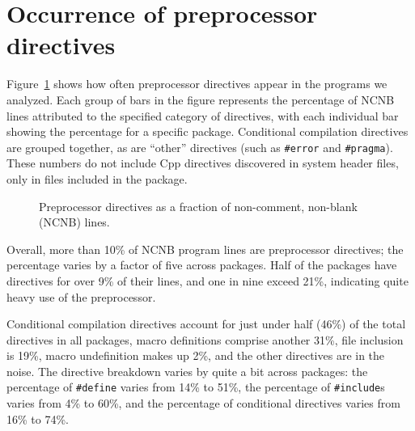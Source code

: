 \documentclass[11pt]{article}
\begin{document}
\section{Occurrence of preprocessor directives}
\label{sec:directives}

Figure~\ref{fig:directives-breakdown} shows how often preprocessor
directives appear in the programs we analyzed.  Each group of bars in the
figure represents the percentage of NCNB lines attributed to the specified
category of directives, with each individual bar showing the percentage for
a specific package.  Conditional compilation directives are grouped together, as
are ``other'' directives (such as {\tt \#error} and {\tt \#pragma}).  These
numbers do not include Cpp directives discovered in system header files,
only in files included in the package.


\begin{figure}
\centerline{}
\caption{Preprocessor directives as a fraction of non-comment,
  non-blank (NCNB) lines.}
\label{fig:directives-breakdown}
\end{figure}

Overall, more than 10\% of NCNB program lines are preprocessor directives;
the percentage varies by a factor of five across packages.  Half of
the packages
have directives for over 9\% of their lines, and one in nine exceed 21\%,
indicating quite heavy use of the preprocessor.



Conditional compilation directives account for just under half (46\%) of
the total directives in all packages, macro definitions comprise another
31\%, file inclusion is 19\%, macro undefinition makes up 2\%, and the
other directives are in the noise.  The directive breakdown varies by quite
a bit across packages: the percentage of {\tt \#define} varies from 14\% to
51\%, the percentage of {\tt \#include}s varies from 4\% to 60\%, and the
percentage of conditional directives varies from 16\% to 74\%.
\end{document}
